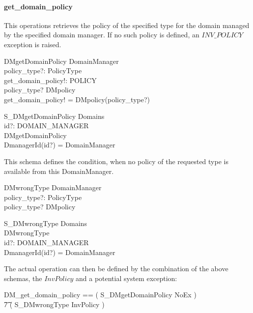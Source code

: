 \paragraph{get\_domain\_policy}
This operations retrieves the policy of the specified type for the domain
managed by the specified domain manager.  If no such policy is defined, an
$INV\_POLICY$ exception is raised.
\begin{zedgroup}
  \begin{schema}{DMgetDomainPolicy}
    \Xi DomainManager \\
    policy\_type?: PolicyType \\
    get\_domain\_policy!: POLICY \\
    \where
    policy\_type? \in \dom DMpolicy \\  
    get\_domain\_policy! = DMpolicy(policy\_type?) \\
  \end{schema}
  \begin{schema}{S\_DMgetDomainPolicy}
    \Xi Domains \\
    id?: DOMAIN\_MANAGER \\
    DMgetDomainPolicy \\
    \where
    DmanagerId(id?) = \theta DomainManager \\
  \end{schema}
\end{zedgroup}
This schema defines the condition, when no policy of the requested type is
available from this DomainManager.
\begin{zedgroup}
  \begin{schema}{DMwrongType}
    \Xi DomainManager \\
    policy\_type?: PolicyType \\
    \where
    policy\_type? \notin \dom DMpolicy \\
  \end{schema}
  \begin{schema}{S\_DMwrongType}
    \Xi Domains \\
    DMwrongType \\
    id?: DOMAIN\_MANAGER \\
    \where
    DmanagerId(id?) = \theta DomainManager \\
  \end{schema}
\end{zedgroup}
The actual operation can then be defined by the combination of the above
schemas, the $InvPolicy$ and a potential system exception:
\begin{zed}
  DM\_get\_domain\_policy == ( S\_DMgetDomainPolicy \land NoEx ) \lor \\
  \t7 ( S\_DMwrongType \land InvPolicy ) \\
\end{zed}


